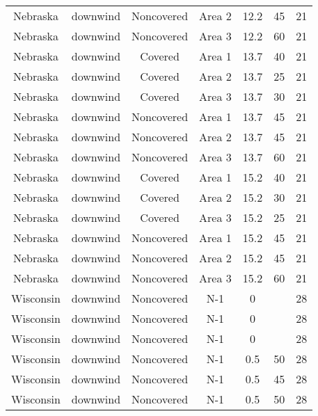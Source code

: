 \documentclass{article}
\begin{document}
\begin{longtable}[c]{ccccccc}
Nebraska  & downwind  & Noncovered & Area 2          & 12.2         & 45          & 21  \\
Nebraska  & downwind  & Noncovered & Area 3          & 12.2         & 60          & 21  \\
Nebraska  & downwind  & Covered     & Area 1          & 13.7         & 40          & 21  \\
Nebraska  & downwind  & Covered     & Area 2          & 13.7         & 25          & 21  \\
Nebraska  & downwind  & Covered     & Area 3          & 13.7         & 30          & 21  \\
Nebraska  & downwind  & Noncovered & Area 1          & 13.7         & 45          & 21  \\
Nebraska  & downwind  & Noncovered & Area 2          & 13.7         & 45          & 21  \\
Nebraska  & downwind  & Noncovered & Area 3          & 13.7         & 60          & 21  \\
Nebraska  & downwind  & Covered     & Area 1          & 15.2         & 40          & 21  \\
Nebraska  & downwind  & Covered     & Area 2          & 15.2         & 30          & 21  \\
Nebraska  & downwind  & Covered     & Area 3          & 15.2         & 25          & 21  \\
Nebraska  & downwind  & Noncovered & Area 1          & 15.2         & 45          & 21  \\
Nebraska  & downwind  & Noncovered & Area 2          & 15.2         & 45          & 21  \\
Nebraska  & downwind  & Noncovered & Area 3          & 15.2         & 60          & 21  \\
Wisconsin & downwind  & Noncovered & N-1             & 0            &             & 28  \\
Wisconsin & downwind  & Noncovered & N-1             & 0            &             & 28  \\
Wisconsin & downwind  & Noncovered & N-1             & 0            &             & 28  \\
Wisconsin & downwind  & Noncovered & N-1             & 0.5          & 50          & 28  \\
Wisconsin & downwind  & Noncovered & N-1             & 0.5          & 45          & 28  \\
Wisconsin & downwind  & Noncovered & N-1             & 0.5          & 50          & 28  \\

\end{longtable}
\end{document}
